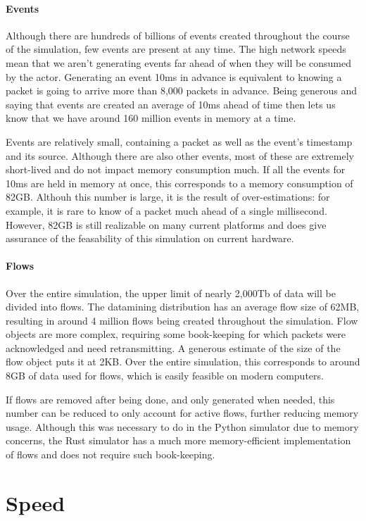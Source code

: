 \paragraph{Events}
Although there are hundreds of billions of events created throughout the course of the simulation, few events are present at any time.
The high network speeds mean that we aren't generating events far ahead of when they will be consumed by the actor.
Generating an event 10ms in advance is equivalent to knowing a packet is going to arrive more than 8,000 packets in advance.
Being generous and saying that events are created an average of 10ms ahead of time then lets us know that we have around 160 million events in memory at a time.

Events are relatively small, containing a packet as well as the event's timestamp and its source.
Although there are also other events, most of these are extremely short-lived and do not impact memory consumption much.
If all the events for 10ms are held in memory at once, this corresponds to a memory consumption of 82GB.
Althouh this number is large, it is the result of over-estimations: for example, it is rare to know of a packet much ahead of a single millisecond.
However, 82GB is still realizable on many current platforms and does give assurance of the feasability of this simulation on current hardware.


\paragraph{Flows}
Over the entire simulation, the upper limit of nearly 2,000Tb of data will be divided into flows.
The datamining distribution has an average flow size of 62MB, resulting in around 4 million flows being created throughout the simulation.
Flow objects are more complex, requiring some book-keeping for which packets were acknowledged and need retransmitting.
A generous estimate of the size of the flow object puts it at 2KB.
Over the entire simulation, this corresponds to around 8GB of data used for flows, which is easily feasible on modern computers.

If flows are removed after being done, and only generated when needed, this number can be reduced to only account for active flows, further reducing memory usage.
Although this was necessary to do in the Python simulator due to memory concerns, the Rust simulator has a much more memory-efficient implementation of flows and does not require such book-keeping.


\section{Speed} \label{limits-speed}


